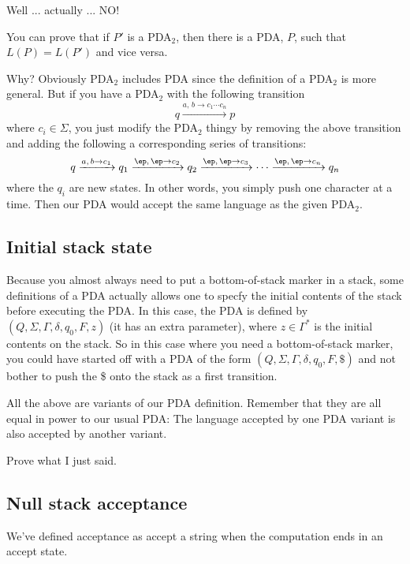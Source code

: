 Well ... actually ... NO!

You can prove that if $P'$ is a PDA$_2$, then there is a PDA, $P$, such that
$L(P) = L(P')$ and vice versa.

Why? 
Obviously PDA$_2$ includes PDA since the definition of a PDA$_2$ is more
general.
But if you have a PDA$_2$ with the following transition
\[
q \xrightarrow{a, \, b \rightarrow c_1 \cdots c_n} p 
\]
where $c_i \in \Sigma$, you just modify the PDA$_2$ 
thingy by removing the above transition and adding the
following a corresponding 
series of transitions:
\[
q 
\xrightarrow{a, \, b \rightarrow c_1} q_1 
\xrightarrow{\ep, \, \ep \rightarrow c_2} q_2
\xrightarrow{\ep, \, \ep \rightarrow c_3}
\cdots  
\xrightarrow{\ep, \, \ep \rightarrow c_n} q_n 
\]
where the $q_i$ are new states.
In other words, you simply push one character at a time.
Then our PDA would accept the same language as the given PDA$_2$.



\newpage
\subsection{Initial stack state}

Because you almost always need to put a bottom-of-stack marker in a stack,
some definitions of a PDA actually allows one to specfy the initial contents
of the stack before executing the PDA.
In this case, the PDA is defined by $(Q, \Sigma, \Gamma, \delta, q_0, F, z)$
(it has an extra parameter), where $z \in \Gamma^*$ is the initial contents
on the stack.
So in this case where you need a bottom-of-stack marker, you could have 
started off with a PDA of the form $(Q, \Sigma, \Gamma, \delta, q_0, F, \$)$
and not bother to push the \$ onto the stack as a first transition.

All the above are variants of our PDA definition.
Remember that they are all equal in power to our usual PDA:
The language accepted by one PDA variant is also accepted by another variant.

\begin{ex}
Prove what I just said.
\end{ex}


\newpage
\subsection{Null stack acceptance}

We've defined acceptance as accept a string when the computation ends in an
accept state.


